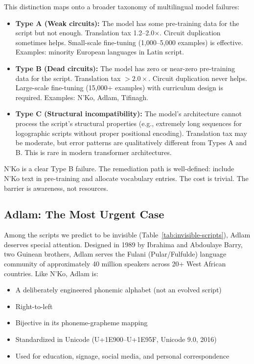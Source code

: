 \documentclass[11pt]{article}
\begin{document}
This distinction maps onto a broader taxonomy of multilingual model failures:
\begin{itemize}
\item \textbf{Type A (Weak circuits):} The model has some pre-training data for the script but not enough. Translation tax 1.2--2.0$\times$. Circuit duplication sometimes helps. Small-scale fine-tuning (1,000--5,000 examples) is effective. Examples: minority European languages in Latin script.
\item \textbf{Type B (Dead circuits):} The model has zero or near-zero pre-training data for the script. Translation tax $> 2.0\times$. Circuit duplication never helps. Large-scale fine-tuning (15,000+ examples) with curriculum design is required. Examples: N'Ko, Adlam, Tifinagh.
\item \textbf{Type C (Structural incompatibility):} The model's architecture cannot process the script's structural properties (e.g., extremely long sequences for logographic scripts without proper positional encoding). Translation tax may be moderate, but error patterns are qualitatively different from Types A and B. This is rare in modern transformer architectures.
\end{itemize}

N'Ko is a clear Type B failure.
The remediation path is well-defined: include N'Ko text in pre-training and allocate vocabulary entries.
The cost is trivial.
The barrier is awareness, not resources.

\subsection{Adlam: The Most Urgent Case}

Among the scripts we predict to be invisible (Table~\ref{tab:invisible-scripts}), Adlam deserves special attention.
Designed in 1989 by Ibrahima and Abdoulaye Barry, two Guinean brothers, Adlam serves the Fulani (Pular/Fulfulde) language community of approximately 40 million speakers across 20+ West African countries.
Like N'Ko, Adlam is:
\begin{itemize}
\item A deliberately engineered phonemic alphabet (not an evolved script)
\item Right-to-left
\item Bijective in its phoneme-grapheme mapping
\item Standardized in Unicode (U+1E900--U+1E95F, Unicode 9.0, 2016)
\item Used for education, signage, social media, and personal correspondence
\end{itemize}
\end{document}
